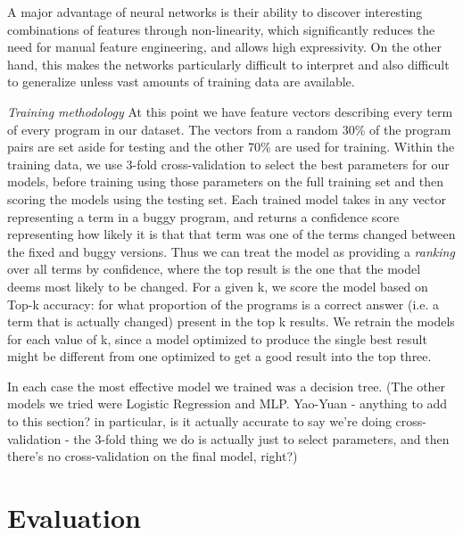 \documentclass[conference]{IEEEtran}
\begin{document}
A major advantage of neural networks is their ability to discover
interesting combinations of features through non-linearity, which
significantly reduces the need for manual feature engineering, and
allows high expressivity.
%
On the other hand, this makes the networks particularly difficult to
interpret and also difficult to generalize unless vast amounts of
training data are available.

\emph{Training methodology} At this point we have feature vectors describing every term of every program in
our dataset. The vectors from a random 30\% of the program pairs are set aside for testing and
the other 70\% are used for training. Within the training data, we use 3-fold
cross-validation to select the best parameters for our models, before training
using those parameters on the full training set and then scoring the models
using the testing set. Each trained model takes in any vector representing a term
in a buggy program, and returns a confidence score representing how likely it is that
that term was one of the terms changed between the fixed and buggy versions.
Thus we can treat the model as providing a \emph{ranking} over all terms by
confidence, where the top result is the one that the model deems most likely
to be changed. For
a given k, we score the model based on Top-k accuracy: for what proportion of the
programs is a correct answer (i.e. a term that is actually changed) present in the
top k results. We retrain the models for each value of k, since a model optimized
to produce the single best result might be different from one optimized to get a
good result into the top three.

In each case the most effective model we trained was a decision tree. (The other
models we tried were Logistic Regression and MLP. Yao-Yuan - anything to add to
this section? in particular, is it actually accurate to say we're doing
cross-validation - the 3-fold thing we do is actually just to select parameters,
and then there's no cross-validation on the final model, right?)

\section{Evaluation}
\label{sec-eval}
\end{document}

